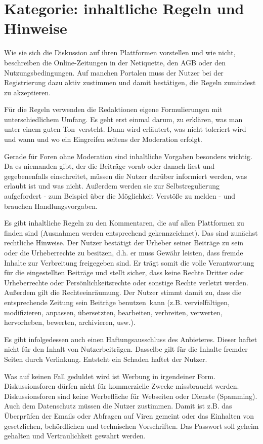 
\section{Kategorie: \glqq inhaltliche Regeln und Hinweise\grqq}

Wie sie sich die Diskussion auf ihren Plattformen vorstellen und wie nicht,
beschreiben die Online-Zeitungen in der Netiquette, den AGB oder den
Nutzungsbedingungen. Auf manchen Portalen muss der Nutzer bei der Registrierung
dazu aktiv zustimmen und damit bestätigen, die Regeln zumindest zu akzeptieren.

Für die Regeln verwenden die Redaktionen eigene Formulierungen mit
unterschiedlichem Umfang. Es geht erst einmal darum, zu erklären, was man unter
einem \glqq guten Ton\grqq\ versteht. Dann wird erläutert, was nicht toleriert
wird und wann und wo ein Eingreifen seitens der Moderation erfolgt.

Gerade für Foren ohne Moderation sind inhaltliche Vorgaben besonders wichtig. Da
es niemanden gibt, der die Beiträge vorab oder danach liest und gegebenenfalls
einschreitet, müssen die Nutzer darüber informiert werden, was erlaubt ist und
was nicht. Außerdem werden sie zur Selbstregulierung aufgefordert - zum Beispiel
über die Möglichkeit Verstöße zu melden - und brauchen Handlungsvorgaben.

Es gibt inhaltliche Regeln zu den Kommentaren, die auf allen Plattformen zu
finden sind (Ausnahmen werden entsprechend gekennzeichnet).  Das sind zunächst
rechtliche Hinweise. Der Nutzer bestätigt der Urheber seiner Beiträge zu sein
oder die Urheberrechte zu besitzen, d.h. er muss Gewähr leisten, dass fremde
Inhalte zur Verbreitung freigegeben sind. Er trägt somit die volle Verantwortung
für die eingestellten Beiträge und stellt sicher, dass keine Rechte Dritter oder
Urheberrechte oder Persönlichkeitsrechte oder sonstige Rechte verletzt werden.
Außerdem gilt die Rechteeinräumung. Der Nutzer stimmt damit zu, dass die
entsprechende Zeitung sein Beiträge \glqq benutzen\grqq\ kann (z.B. vervielfältigen,
modifizieren, anpassen, übersetzten, bearbeiten, verbreiten, verwerten,
hervorheben, bewerten, archivieren, usw.).

Es gibt infolgedessen auch einen Haftungsausschluss des Anbieteres. Dieser
haftet nicht für den Inhalt von Nutzerbeiträgen. Dasselbe gilt für die Inhalte
fremder Seiten durch Verlinkung. Entsteht ein Schaden haftet der Nutzer.

Was auf keinen Fall geduldet wird ist Werbung in irgendeiner Form.
Diskussionsforen dürfen nicht für kommerzielle Zwecke missbraucht werden.
Diskussionsforen sind keine Werbefläche für Webseiten oder Dienste (Spamming).
Auch dem Datenschutz müssen die Nutzer zustimmen. Damit ist z.B. das
Über\-prü\-fen der Emails oder Abfragen auf Viren gemeint oder das Einhalten von
gesetzlichen, behördlichen und technischen Vorschriften. Das Passwort soll
geheim gehalten und Vertraulichkeit gewahrt werden.

